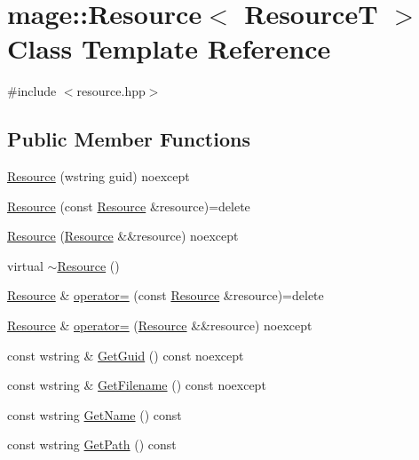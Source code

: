 \hypertarget{classmage_1_1_resource}{}\section{mage\+:\+:Resource$<$ ResourceT $>$ Class Template Reference}
\label{classmage_1_1_resource}


{\ttfamily \#include $<$resource.\+hpp$>$}

\subsection*{Public Member Functions}
\begin{DoxyCompactItemize}
\item 
\mbox{\hyperlink{classmage_1_1_resource_a397a81a1195dea231776db9787cad52d}{Resource}} (wstring guid) noexcept
\item 
\mbox{\hyperlink{classmage_1_1_resource_a53da586d9bae285ab50c4cca2421a9ce}{Resource}} (const \mbox{\hyperlink{classmage_1_1_resource}{Resource}} \&resource)=delete
\item 
\mbox{\hyperlink{classmage_1_1_resource_adfff024cb267644156ba1b357d6f8d10}{Resource}} (\mbox{\hyperlink{classmage_1_1_resource}{Resource}} \&\&resource) noexcept
\item 
virtual \mbox{\hyperlink{classmage_1_1_resource_a56a3ac799224e100b271b65ec455b59e}{$\sim$\+Resource}} ()
\item 
\mbox{\hyperlink{classmage_1_1_resource}{Resource}} \& \mbox{\hyperlink{classmage_1_1_resource_a938159cb02ec565b9b957f993db4769d}{operator=}} (const \mbox{\hyperlink{classmage_1_1_resource}{Resource}} \&resource)=delete
\item 
\mbox{\hyperlink{classmage_1_1_resource}{Resource}} \& \mbox{\hyperlink{classmage_1_1_resource_aa1f7a7ddd31f4fc16293b4a5ca9a93c8}{operator=}} (\mbox{\hyperlink{classmage_1_1_resource}{Resource}} \&\&resource) noexcept
\item 
const wstring \& \mbox{\hyperlink{classmage_1_1_resource_adaa2464cb1fdb51a3f6028c0f316d083}{Get\+Guid}} () const noexcept
\item 
const wstring \& \mbox{\hyperlink{classmage_1_1_resource_a21bed60ba52a741eaffddc953f241be7}{Get\+Filename}} () const noexcept
\item 
const wstring \mbox{\hyperlink{classmage_1_1_resource_a6414c6f8342f4cc92e7ed7861000cd2f}{Get\+Name}} () const
\item 
const wstring \mbox{\hyperlink{classmage_1_1_resource_a01cb4f6f8ff66a1f2545edc89af656c9}{Get\+Path}} () const
\end{DoxyCompactItemize}
